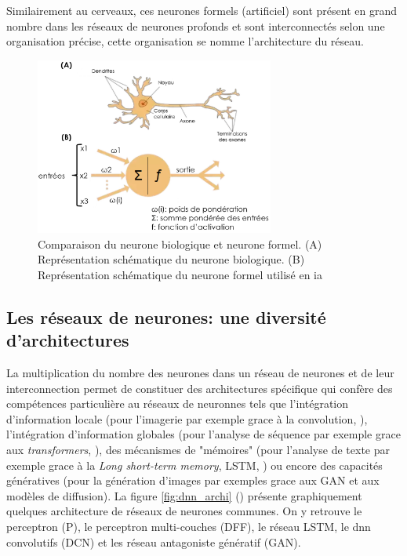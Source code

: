 Similairement au cerveaux, ces neurones formels (artificiel) sont présent en grand nombre dans les réseaux de neurones profonds et sont interconnectés selon une organisation précise, cette organisation se nomme l'architecture du réseau.
\begin{figure}[!htbp]
 \centering
 \includegraphics[width=0.7\textwidth]{figures/neuronne.png}
 \caption[Comparaison du neurone biologique et du neurone formel]{Comparaison du neurone biologique et neurone formel. (A) Représentation schématique du neurone biologique. (B) Représentation schématique du neurone formel utilisé en \gls{ia}}
 \label{fig:neurons}
\end{figure}
\subsection{Les réseaux de neurones: une diversité d'architectures}
La multiplication du nombre des neurones dans un réseau de neurones et de leur interconnection permet de constituer des architectures spécifique qui confère des compétences particulière au réseaux de neuronnes tels que l'intégration d'information locale (pour l'imagerie par exemple grace à la convolution, \cite{fukushima_neocognitron_1980}), l'intégration d'information globales (pour l'analyse de séquence par exemple grace aux \textit{transformers}, \cite{vaswani_attention_2017}), des mécanismes de "mémoires" (pour l'analyse de texte par exemple grace à la \textit{Long short-term memory}, LSTM, \cite{hochreiter_long_1997}) ou encore des capacités génératives (pour la génération d'images par exemples grace aux GAN et aux modèles de diffusion). La figure \ref{fig:dnn_archi} (\cite{leijnen_neural_2016}) présente graphiquement quelques architecture de réseaux de neurones communes. On y retrouve le perceptron (P), le perceptron multi-couches (DFF), le réseau LSTM, le \gls{dnn} convolutifs (DCN) et les réseau antagoniste génératif (GAN).

